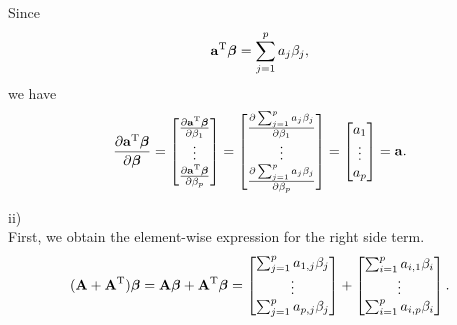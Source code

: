 \documentclass[a4paper]{article}
\begin{document}
Since 
\begin{align*}
\bm{\mathrm{a}}^{\rm T}\bm{\beta} =
\sum_{j=1}^{p} a_{j}\beta_{j}
,
\end{align*} we have
\begin{align*}
\frac{\partial \bm{\mathrm{a}}^{\rm T}\bm{\beta}}{\partial \bm{\beta}}
=
\begin{bmatrix}
\frac{\partial \bm{\mathrm{a}}^{\rm T}\bm{\beta}}{\partial \beta_{1}}\\
\vdots\\
\frac{\partial \bm{\mathrm{a}}^{\rm T}\bm{\beta}}{\partial \beta_{p}}\\
\end{bmatrix}
=
\begin{bmatrix}
\frac{\partial \sum_{j=1}^{p} a_{j}\beta_{j}}{\partial \beta_{1}}\\
\vdots\\
\frac{\partial \sum_{j=1}^{p} a_{j}\beta_{j}}{\partial \beta_{p}}\\
\end{bmatrix}
=
\begin{bmatrix}
a_{1}\\
\vdots\\
a_{p}\\
\end{bmatrix}
=
\bm{\mathrm{a}}.
\end{align*}


ii)\\

First, we obtain the element-wise expression for the right side term.
\begin{align*}
(\bm{\mathrm{A}} + \bm{\mathrm{A}}^{\rm T})\bm{\beta}
= \bm{\mathrm{A}}\bm{\beta} + \bm{\mathrm{A}}^{\rm T}\bm{\beta}
= 
\begin{bmatrix}
\sum_{j=1}^{p} a_{1,j}\beta_{j}\\
\vdots\\
\sum_{j=1}^{p} a_{p,j}\beta_{j}\\
\end{bmatrix}
+
\begin{bmatrix}
\sum_{i=1}^{p} a_{i,1}\beta_{i}\\
\vdots\\
\sum_{i=1}^{p} a_{i,p}\beta_{i}\\
\end{bmatrix}.
\end{align*}
\end{document}
